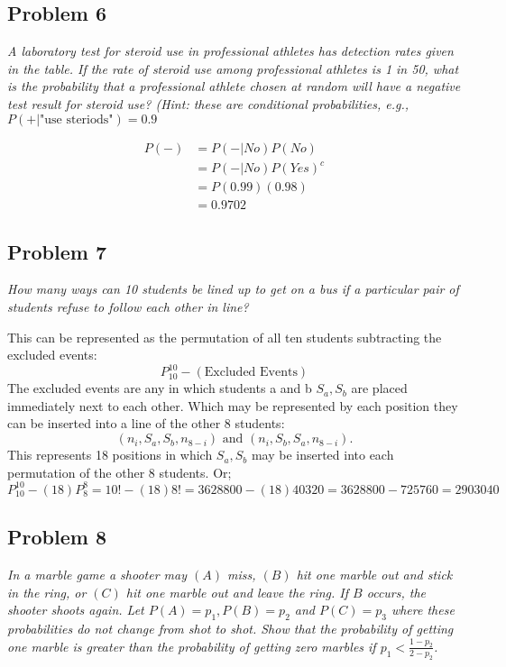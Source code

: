 \documentclass[a4paper,man,natbib]{apa6}
\begin{document}
\subsection{Problem 6}
\emph{A laboratory test for steroid use in professional athletes has detection rates given in the table.
	If the rate of steroid use among professional athletes is 1 in 50, what is the probability that a professional athlete chosen at random will have a negative test result for steroid use? (Hint: these are conditional probabilities, e.g.,} 
	$P(+|  \text{"use steriods"} )=0.9$
	
	\begin{align*}
		P(-) &= P(-|No)P(No) \\
		&= P(-|No)P(Yes)^c \\
		&= P(0.99)(0.98) \\
		&= 0.9702
	\end{align*}
	
\vspace{1em}

\subsection{Problem 7}
\emph{How many ways can 10 students be lined up to get on a bus if a particular pair of students refuse to follow each other in line?}\vspace{1em}

This can be represented as the permutation of all ten students subtracting the excluded events:
$$ P^{10}_{10} - (\text{Excluded Events})$$
The excluded events are any in which students a and b $S_a, S_b$ are placed immediately next to each other. Which may be represented by each position they can be inserted into a line of the other 8 students:
$$ (n_i, S_a, S_b, n_{8-i})\text{ and  }(n_i, S_b, S_a, n_{8-i}).$$
This represents 18 positions in which  $S_a, S_b$ may be inserted into each permutation of the other 8 students. Or;
$$P^{10}_{10} - (18)P^{8}_{8}  = 10! - (18)8! = 3628800 - (18)40320 = 3628800 - 725760 = 2903040$$

\subsection{Problem 8}
\emph{ 
	In a marble game a shooter may $(A)$ miss, $(B)$ hit one marble out and stick in the ring, or $(C)$ hit one marble out and leave the ring. If $B$ occurs, the shooter shoots again. Let  $P(A)=p_1, P(B)=p_2$ and $P(C)=p_3$ where these probabilities do not change from shot to shot. Show that the probability of getting one marble is greater than the probability of getting zero marbles if $p_1 < \frac{1-p_2}{2-p_2}$. }\vspace{1em}
\end{document}
